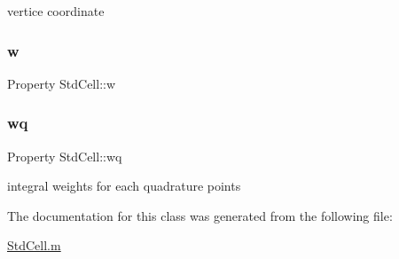 vertice coordinate 

\mbox{\label{class_std_cell_aa3fb1019badb7a9eee7e2d99df715f4d}} 
\subsubsection{\texorpdfstring{w}{w}}
{\footnotesize\ttfamily Property Std\+Cell\+::w\hspace{0.3cm}{\ttfamily [protected]}}

\mbox{\label{class_std_cell_aa3ef53c6adecba5176667c0a38a178ee}} 
\subsubsection{\texorpdfstring{wq}{wq}}
{\footnotesize\ttfamily Property Std\+Cell\+::wq\hspace{0.3cm}{\ttfamily [protected]}}



integral weights for each quadrature points 



The documentation for this class was generated from the following file\+:\begin{DoxyCompactItemize}
\item 
\hyperlink{_std_cell_8m}{Std\+Cell.\+m}\end{DoxyCompactItemize}
